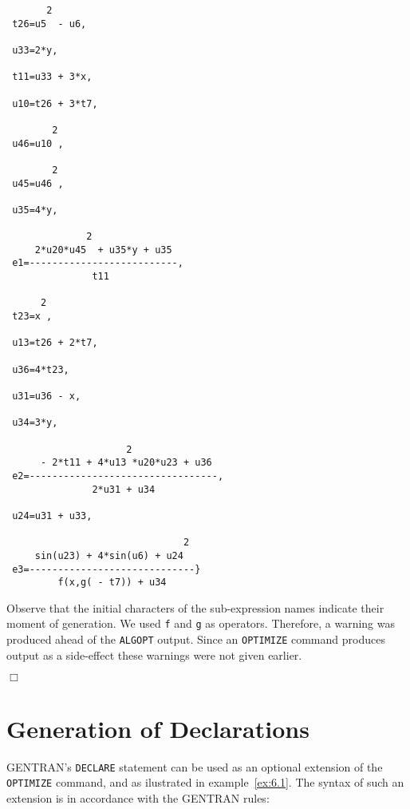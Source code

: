 \newpage
{\small
\begin{verbatim}
       2
 t26=u5  - u6,

 u33=2*y,

 t11=u33 + 3*x,

 u10=t26 + 3*t7,

        2
 u46=u10 ,

        2
 u45=u46 ,

 u35=4*y,

              2
     2*u20*u45  + u35*y + u35
 e1=--------------------------,
               t11

      2
 t23=x ,

 u13=t26 + 2*t7,

 u36=4*t23,

 u31=u36 - x,

 u34=3*y,

                     2
      - 2*t11 + 4*u13 *u20*u23 + u36
 e2=---------------------------------,
               2*u31 + u34

 u24=u31 + u33,

                               2
     sin(u23) + 4*sin(u6) + u24
 e3=-----------------------------}
         f(x,g( - t7)) + u34
\end{verbatim}}
\noindent
Observe that the initial characters of the sub-expression names indicate
their moment of generation. We used {\tt f} and {\tt g} as operators.
Therefore, a warning was produced ahead of the {\tt ALGOPT} output.
Since an {\tt OPTIMIZE} command produces output as a side-effect these warnings
were not given earlier.
{\small
\begin{flushright}
$\Box$
\end{flushright}}
\newpage
\section{Generation of Declarations}\label{SCOPE:decl}

GENTRAN's {\tt DECLARE} statement can be used as an optional extension of the
{\tt OPTIMIZE} command, and as ilustrated in example~\ref{ex:6.1}. The syntax
of such an extension is in accordance with the GENTRAN rules:

